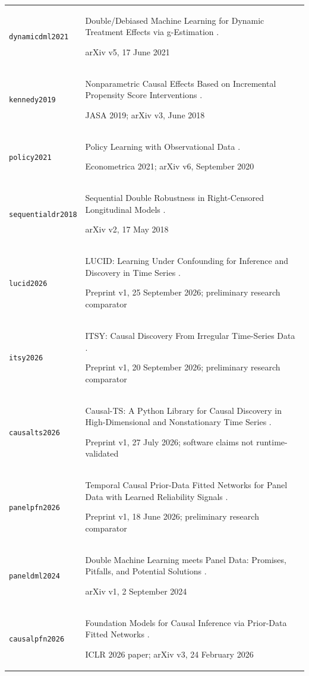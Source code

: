 \begin{longtable}{P{32mm}P{112mm}}
{\scriptsize\texttt{dynamicdml2021}} & Double/Debiased Machine Learning for Dynamic Treatment Effects via g-Estimation \citep{dynamicdml2021}.\par arXiv v5, 17 June 2021\\
{\scriptsize\texttt{kennedy2019}} & Nonparametric Causal Effects Based on Incremental Propensity Score Interventions \citep{kennedy2019}.\par JASA 2019; arXiv v3, June 2018\\
{\scriptsize\texttt{policy2021}} & Policy Learning with Observational Data \citep{policy2021}.\par Econometrica 2021; arXiv v6, September 2020\\
{\scriptsize\texttt{sequentialdr2018}} & Sequential Double Robustness in Right-Censored Longitudinal Models \citep{sequentialdr2018}.\par arXiv v2, 17 May 2018\\
{\scriptsize\texttt{lucid2026}} & LUCID: Learning Under Confounding for Inference and Discovery in Time Series \citep{lucid2026}.\par Preprint v1, 25 September 2026; preliminary research comparator\\
{\scriptsize\texttt{itsy2026}} & ITSY: Causal Discovery From Irregular Time-Series Data \citep{itsy2026}.\par Preprint v1, 20 September 2026; preliminary research comparator\\
{\scriptsize\texttt{causalts2026}} & Causal-TS: A Python Library for Causal Discovery in High-Dimensional and Nonstationary Time Series \citep{causalts2026}.\par Preprint v1, 27 July 2026; software claims not runtime-validated\\
{\scriptsize\texttt{panelpfn2026}} & Temporal Causal Prior-Data Fitted Networks for Panel Data with Learned Reliability Signals \citep{panelpfn2026}.\par Preprint v1, 18 June 2026; preliminary research comparator\\
{\scriptsize\texttt{paneldml2024}} & Double Machine Learning meets Panel Data: Promises, Pitfalls, and Potential Solutions \citep{paneldml2024}.\par arXiv v1, 2 September 2024\\
{\scriptsize\texttt{causalpfn2026}} & Foundation Models for Causal Inference via Prior-Data Fitted Networks \citep{causalpfn2026}.\par ICLR 2026 paper; arXiv v3, 24 February 2026\\

\end{longtable}

